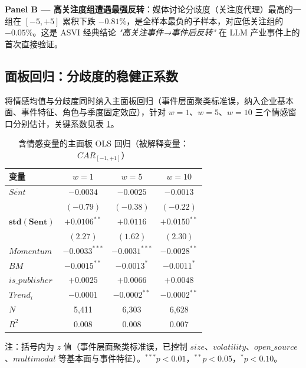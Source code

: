 \documentclass[11pt]{ctexart}
\begin{document}
\textbf{Panel B — 高关注度组遭遇最强反转}：媒体讨论分歧度（关注度代理）最高的一组在 $[-5,+5]$ 累积下跌 $-0.81\%$，是全样本最负的子样本，对应低关注组的 $-0.05\%$。这是 ASVI 经典结论 \emph{"高关注事件→事件后反转"} 在 LLM 产业事件上的首次直接验证。

\subsection{面板回归：分歧度的稳健正系数}

将情感均值与分歧度同时纳入主面板回归（事件层面聚类标准误，纳入企业基本面、事件特征、角色与季度固定效应），针对 $w=1$、$w=5$、$w=10$ 三个情感窗口分别估计，关键系数见表 \ref{tab:ols_sent}。

\begin{table}[htbp]
\centering
\caption{含情感变量的主面板 OLS 回归（被解释变量：$CAR_{[-1,+1]}$）}
\label{tab:ols_sent}
\small
\begin{tabular}{lccc}
\toprule
变量 & $w=1$ & $w=5$ & $w=10$ \\
\midrule
$\overline{Sent}$         & $-0.0034$         & $-0.0025$        & $-0.0013$ \\
                          & $(-0.79)$         & $(-0.38)$        & $(-0.22)$ \\
$\mathbf{std(Sent)}$      & $\mathbf{+0.0106^{**}}$ & $+0.0116$    & $\mathbf{+0.0150^{**}}$ \\
                          & $(2.27)$          & $(1.62)$         & $(2.30)$ \\
$Momentum$                & $-0.0033^{***}$    & $-0.0031^{***}$  & $-0.0028^{**}$ \\
$BM$                      & $-0.0015^{**}$     & $-0.0013^{*}$    & $-0.0011^{*}$ \\
$is\_publisher$           & $+0.0025$         & $+0.0066$         & $+0.0048$ \\
$Trend_i$                 & $-0.0001$         & $-0.0002^{**}$    & $-0.0002^{**}$ \\
\midrule
$N$       & 5{,}411 & 6{,}303 & 6{,}628 \\
$R^2$     & 0.008 & 0.008 & 0.007 \\
\bottomrule
\end{tabular}
\begin{tablenotes}\footnotesize
\item 注：括号内为 $z$ 值（事件层面聚类标准误，已控制 $size$、$volatility$、$open\_source$、$multimodal$ 等基本面与事件特征）。$^{***}p<0.01$，$^{**}p<0.05$，$^{*}p<0.10$。
\end{tablenotes}
\end{table}
\end{document}
